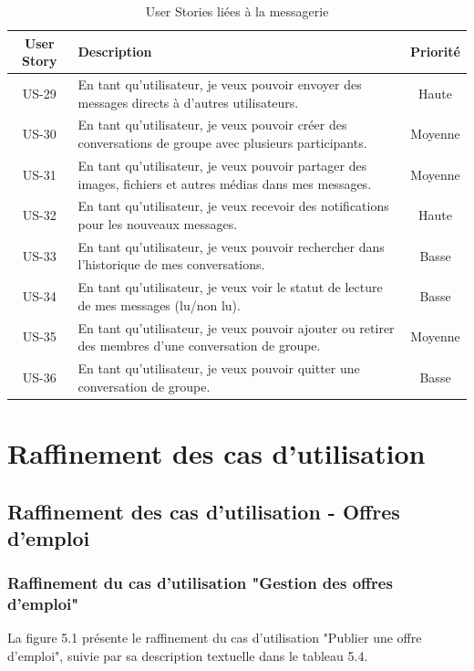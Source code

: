 \begin{table}[H]
\centering
\begin{tabularx}{\textwidth}{|c|X|c|}
\hline
\textbf{User Story} & \textbf{Description} & \textbf{Priorité} \\
\hline
US-29 & En tant qu'utilisateur, je veux pouvoir envoyer des messages directs à d'autres utilisateurs. & Haute \\
\hline
US-30 & En tant qu'utilisateur, je veux pouvoir créer des conversations de groupe avec plusieurs participants. & Moyenne \\
\hline
US-31 & En tant qu'utilisateur, je veux pouvoir partager des images, fichiers et autres médias dans mes messages. & Moyenne \\
\hline
US-32 & En tant qu'utilisateur, je veux recevoir des notifications pour les nouveaux messages. & Haute \\
\hline
US-33 & En tant qu'utilisateur, je veux pouvoir rechercher dans l'historique de mes conversations. & Basse \\
\hline
US-34 & En tant qu'utilisateur, je veux voir le statut de lecture de mes messages (lu/non lu). & Basse \\
\hline
US-35 & En tant qu'utilisateur, je veux pouvoir ajouter ou retirer des membres d'une conversation de groupe. & Moyenne \\
\hline
US-36 & En tant qu'utilisateur, je veux pouvoir quitter une conversation de groupe. & Basse \\
\hline
\end{tabularx}
\caption{User Stories liées à la messagerie}
\end{table}

\section{Raffinement des cas d'utilisation}
\subsection{Raffinement des cas d'utilisation - Offres d'emploi}
\subsubsection{Raffinement du cas d'utilisation "Gestion des offres d'emploi"}
La figure 5.1 présente le raffinement du cas d'utilisation "Publier une offre d'emploi", suivie par sa description textuelle dans le tableau 5.4.

